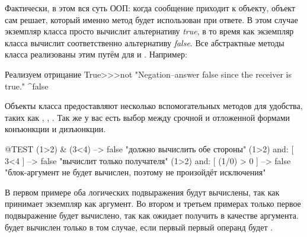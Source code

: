 \documentclass[a4paper,10pt,twoside]{book}
\begin{document}
Фактически, в этом вся суть ООП: когда сообщение приходит к объекту, объект сам решает, который именно метод будет использован при ответе. В этом случае экземпляр класса просто вычислит альтернативу \emph{true}, в то время как экземпляр класса  вычислит соответственно альтернативу \emph{false}. Все абстрактные методы класса  реализованы этим путём для  и . Например:

\begin{method}{Реализуем отрицание}
True>>>not
    "Negation--answer false since the receiver is true."
    ^false
\end{method}


Объекты класса  предоставляют несколько вспомогательных методов для удобства, таких как , , . Так же у вас есть выбор между срочной и отложенной формами конъюнкции и дизъюнкции.

\begin{code}{@TEST}
(1>2) & (3<4)              --> false    "должно вычислить обе стороны"
(1>2) and: [ 3<4 ]        --> false    "вычислит только получателя"
(1>2) and: [ (1/0) > 0 ] --> false    "блок-аргумент не будет вычислен, поэтому не произойдёт исключения"
\end{code}

В первом примере оба логических подвыражения будут вычислены, так как  принимает экземпляр  как аргумент.
Во втором и третьем примерах только первое подвыражение будет вычислено, так как  ожидает получить  в качестве аргумента.  будет вычислен только в том случае, если первый первый операнд будет .
\end{document}
